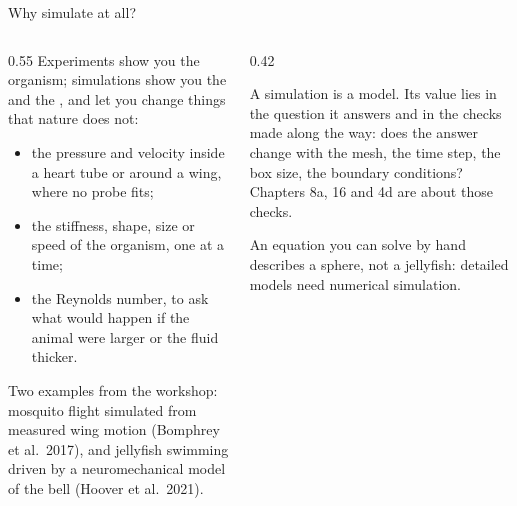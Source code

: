 \documentclass[aspectratio=169,11pt]{beamer}
\begin{document}
\begin{frame}{Why simulate at all?}
\begin{columns}[T,onlytextwidth]
\begin{column}{0.55\textwidth}
\small Experiments show you the organism; simulations show you the  and the , and let you change things that nature does not:
\begin{itemize}
  \item the pressure and velocity inside a heart tube or around a wing, where no probe fits;
  \item the stiffness, shape, size or speed of the organism, one at a time;
  \item the Reynolds number, to ask what would happen if the animal were larger or the fluid thicker.
\end{itemize}
Two examples from the workshop: mosquito flight simulated from measured wing motion (Bomphrey et al.\ 2017), and jellyfish swimming driven by a neuromechanical model of the bell (Hoover et al.\ 2021).
\end{column}
\begin{column}{0.42\textwidth}
\begin{punchbox}
\small A simulation is a model. Its value lies in the question it answers and in the checks made along the way: does the answer change with the mesh, the time step, the box size, the boundary conditions? Chapters 8a, 16 and 4d are about those checks.
\end{punchbox}
\vspace{1mm}
\small An equation you can solve by hand describes a sphere, not a jellyfish: detailed models need numerical simulation.
\end{column}
\end{columns}
\end{frame}
\end{document}

